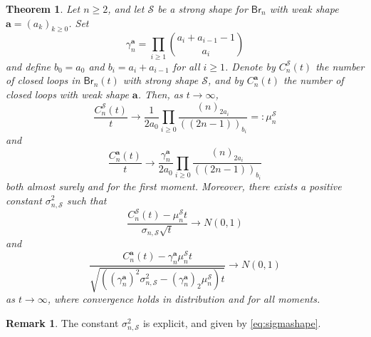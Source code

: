 \documentclass[a4paper,11pt,reqno]{amsart}
\newcommand{\paul}[1]{\todo[color=yellow!70,inline]{Paul: #1}}
\newcommand{\fabian}[1]{\todo[color=red!50,inline]{Fabian: #1}}
\newcommand{\Br}{\mathsf{Br}}
\newcommand{\shape}{\mathscr{S}}
\newcommand{\fdf}[1]{(\!(#1)\!)}
\newcommand{\mb}{\mathbf}
\newtheorem{theorem}[lemma]{Theorem}
\theoremstyle{definition}
\newtheorem{remark}[lemma]{Remark}
\begin{document}
\begin{theorem}\label{theorem:shape}
 Let $n\geq 2$, and let $\shape$ be a strong shape for $\Br_n$ with weak shape $\mb a=(a_k)_{k\geq0}$. Set 
 \[
  \gamma_n^{\mb a} = \prod_{i\geq1} \binom{a_i+a_{i-1}-1}{a_i}
 \]
 and define $b_0=a_0$ and $b_i=a_i+a_{i-1}$ for all $i\geq 1$. Denote by $C_n^\shape(t)$  the number of closed loops in $\Br_n(t)$ with strong shape $\shape$, and by $C_n^{\mb a}(t)$ the number of closed loops with weak shape $\mb a$. Then, as $t\to\infty$,
 \begin{equation}\label{eq:sshapeLLN}
  \frac{C_n^\shape(t)}{t} \to \frac{1}{2a_0} \prod_{i\geq0} \frac{(n)_{2a_i}}{\fdf{2n-1}_{b_i}} =: \mu_n^\shape
 \end{equation}
 and
 \begin{equation}\label{eq:wshapeLLN}
  \frac{C_n^{\mb a}(t)}{t} \to \frac{\gamma_n^{\mb a}}{2a_0} \prod_{i\geq0} \frac{(n)_{2a_i}}{\fdf{2n-1}_{b_i}}
 \end{equation}
 both almost surely and for the first moment. Moreover, there exists a positive constant $\sigma_{n,\shape}^2$  such that 
 \begin{equation}\label{eq:sshapeCLT}
  \frac{C_n^\shape(t)-\mu_n^\shape t}{\sigma_{n,\shape}\sqrt{t}} \to N(0,1)
 \end{equation}
 and
 \begin{equation}\label{eq:wshapeCLT}
  \frac{C_n^{\mb a}(t)-\gamma_n^{\mb a}\mu_n^\shape t}{\sqrt{\left((\gamma_n^{\mb a})^2\sigma_{n,\shape}^2 - (\gamma_n^{\mb a})_2\mu_n^\shape\right)t}} \to N(0,1)
 \end{equation}
 as $t\to\infty$, where convergence holds in distribution and for all moments. 
\end{theorem}

\begin{remark}
 The constant $\sigma_{n,\shape}^2$ is explicit, and given by \eqref{eq:sigmashape}. 
\end{remark}


\end{document}

